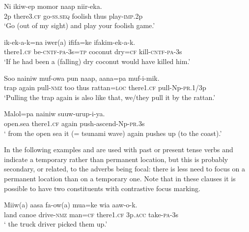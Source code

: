 \ea%
\label{ex:x1573}
\gll Ni  ikiw-ep momor naap niir-eka. \\
2p there3.\textsc{cf} go-\textsc{ss}.\textsc{seq} foolish thus play-\textsc{imp}.2p\\
\glt`Go  (out of my sight) and play your foolish game.'
\z

\ea%
\label{ex:x466}
\gll {} ik-ek-a-k=na iwer(a) ififa=ke ifakim-ek-a-k. \\
there1.\textsc{cf} be-\textsc{cntf}-\textsc{pa}-3s=\textsc{tp} coconut dry=\textsc{cf} kill-\textsc{cntf}-\textsc{pa}-3s\\
\glt`If he had been  a (falling) dry coconut would have killed him.'
\z

\ea%
\label{ex:x1197}
\gll Soo nainiw muf-owa pun naap, aana=pa  muf-i-mik. \\
trap again pull-\textsc{nmz} too thus rattan=\textsc{loc} there1.\textsc{cf} pull-Np-\textsc{pr}.1/3p\\
\glt`Pulling the trap again is also like that, we/they pull it  by the rattan.'
\z

\ea%
\label{ex:x1198}
\gll Malol=pa  nainiw suuw-urup-i-ya. \\
open.sea there1.\textsc{cf} again push-ascend-Np-\textsc{pr}.3s\\
\glt` from the open sea it (= tsunami wave) again pushes up (to the coast).'
\z

In the following examples  and are used with past or present tense verbs and indicate a temporary rather than permanent location, but this is probably secondary, or related, to the adverbs being focal: there is less need to focus on a permanent location than on a temporary one. Note that in these clauses it is possible to have two constituents with contrastive focus marking.

\ea%
\label{ex:x1146}
\gll Miiw(a) aasa fa-ow(a) mua=ke  wia aaw-o-k. \\
land canoe drive-\textsc{nmz} man=\textsc{cf} there1.\textsc{cf} 3p.\textsc{acc} take-\textsc{pa}-3s\\
\glt` the truck driver picked them up.'
\z

